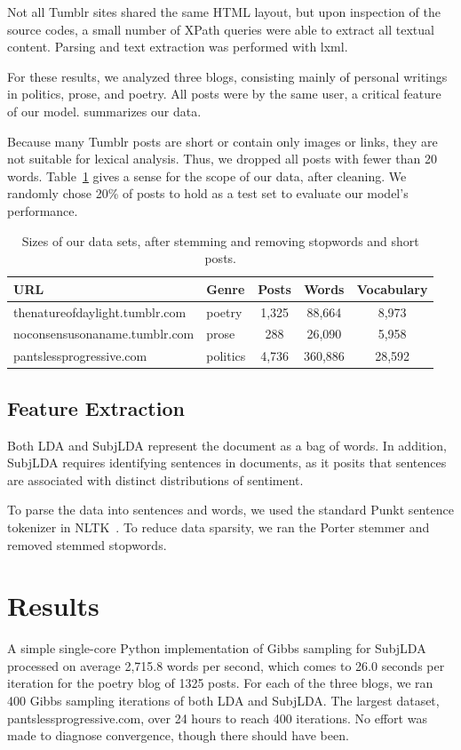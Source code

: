 \documentclass{article}
\begin{document}
Not all Tumblr sites shared the same HTML layout, but upon inspection
of the source codes, a small number of XPath queries were able to
extract all textual content.  Parsing and text extraction was
performed with lxml.

For these results, we analyzed three blogs, consisting mainly of
personal writings in politics, prose, and poetry. All posts were
by the same user, a critical feature of our model. 
summarizes our data.

Because many Tumblr posts are short or contain only images or links,
they are not suitable for lexical analysis. Thus, we dropped all
posts with fewer than 20 words. Table~\ref{tab:data} gives a
sense for the scope of our data, after cleaning. We randomly chose
20\% of posts to hold as a test set to evaluate our model's
performance.

\begin{table} 
\centering
\begin{tabular}{ l l c c c }
\bf URL & \bf Genre & \bf Posts & \bf Words & \bf Vocabulary \\
\hline
thenatureofdaylight.tumblr.com & poetry & 1,325 & 88,664 & 8,973 \\
noconsensusonaname.tumblr.com & prose & 288 & 26,090 & 5,958 \\
pantslessprogressive.com & politics & 4,736 & 360,886 & 28,592 \\
\end{tabular}
\caption{Sizes of our data sets, after stemming and removing stopwords and short posts.\label{tab:data}}
\end{table}

\subsection{Feature Extraction}
Both LDA and SubjLDA represent the document as a bag of words.  In
addition, SubjLDA requires identifying sentences in documents, as
it posits that sentences are associated with distinct distributions
of sentiment.

To parse the data into sentences and words, we used the standard
Punkt sentence tokenizer in NLTK~\citep{bird09}. To reduce data
sparsity, we ran the Porter stemmer and removed stemmed stopwords.

\section{Results} 
A simple single-core Python implementation of Gibbs sampling for
SubjLDA processed on average 2,715.8 words per second, which comes
to 26.0 seconds per iteration for the poetry blog of 1325 posts.
For each of the three blogs, we ran 400 Gibbs sampling iterations
of both LDA and SubjLDA. The largest dataset, pantslessprogressive.com,
over 24 hours to reach 400 iterations. No effort was made to diagnose
convergence, though there should have been.
\end{document}
